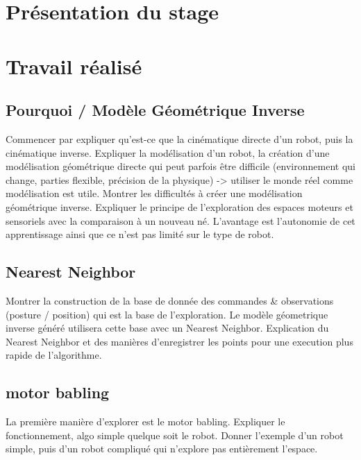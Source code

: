 \documentclass[11pt,french]{article}
\begin{document}
\section{Présentation du stage}

\section{Travail réalisé}

\subsection{Pourquoi / Modèle Géométrique Inverse}
Commencer par expliquer qu'est-ce que la cinématique directe d'un robot, puis la cinématique inverse. Expliquer la modélisation d'un robot, la création d'une modélisation géométrique directe qui peut parfois être difficile (environnement qui change, parties flexible, précision de la physique) -> utiliser le monde réel comme modélisation est utile.
Montrer les difficultés à créer une modélisation géométrique inverse. Expliquer le principe de l'exploration des espaces moteurs et sensoriels avec la comparaison à un nouveau né. L'avantage est l'autonomie de cet apprentissage ainsi que ce n'est pas limité sur le type de robot.

\subsection{Nearest Neighbor}
Montrer la construction de la base de donnée des commandes \& observations (posture / position) qui est la base de l'exploration. Le modèle géometrique inverse généré utilisera cette base avec un Nearest Neighbor. Explication du Nearest Neighbor et des manières d'enregistrer les points pour une execution plus rapide de l'algorithme.

\subsection{motor babling}
La première manière d'explorer est le motor babling. Expliquer le fonctionnement, algo simple quelque soit le robot. Donner l'exemple d'un robot simple, puis d'un robot compliqué qui n'explore pas entièrement l'espace.
\end{document}
